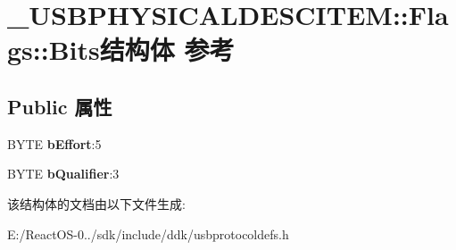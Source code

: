 \hypertarget{struct___u_s_b_p_h_y_s_i_c_a_l_d_e_s_c_i_t_e_m_1_1_flags_1_1_bits}{}\section{\+\_\+\+U\+S\+B\+P\+H\+Y\+S\+I\+C\+A\+L\+D\+E\+S\+C\+I\+T\+EM\+:\+:Flags\+:\+:Bits结构体 参考}
\label{struct___u_s_b_p_h_y_s_i_c_a_l_d_e_s_c_i_t_e_m_1_1_flags_1_1_bits}
\subsection*{Public 属性}
\begin{DoxyCompactItemize}
\item 
\mbox{\label{struct___u_s_b_p_h_y_s_i_c_a_l_d_e_s_c_i_t_e_m_1_1_flags_1_1_bits_a92beb4ab3dac357c7b7d3700d32b4870}} 
B\+Y\+TE {\bfseries b\+Effort}\+:5
\item 
\mbox{\label{struct___u_s_b_p_h_y_s_i_c_a_l_d_e_s_c_i_t_e_m_1_1_flags_1_1_bits_a4291d05b60d30668f5641e3637205418}} 
B\+Y\+TE {\bfseries b\+Qualifier}\+:3
\end{DoxyCompactItemize}


该结构体的文档由以下文件生成\+:\begin{DoxyCompactItemize}
\item 
E\+:/\+React\+O\+S-\/0../sdk/include/ddk/usbprotocoldefs.\+h\end{DoxyCompactItemize}
